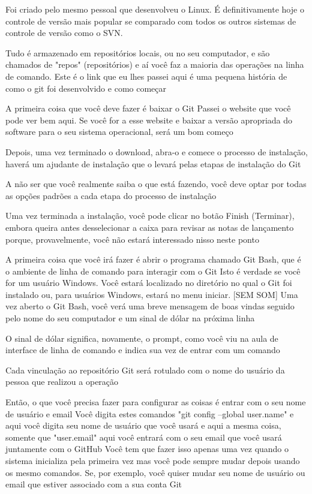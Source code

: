 Foi criado pelo mesmo pessoal que desenvolveu o Linux. É definitivamente hoje o controle de versão mais popular se comparado com todos os outros sistemas de controle de versão como o SVN. 

Tudo é armazenado em repositórios locais, ou no seu computador, e são chamados de "repos" (repositórios) e aí você faz a maioria das operações na linha de comando. Este é o link que eu lhes passei aqui é uma pequena história de como o git foi desenvolvido e como começar 

A primeira coisa que você deve fazer é baixar o Git Passei o website que você pode ver bem aqui. Se você for a esse website e baixar a versão apropriada do software para o seu sistema operacional, será um bom começo 

Depois, uma vez  terminado o download, abra-o e comece o processo de instalação, haverá um ajudante de instalação que o levará pelas etapas de instalação do Git 

A não ser que você realmente saiba o que está fazendo, você deve optar por todas as opções padrões a cada etapa do processo de instalação 

Uma vez terminada a instalação, você pode clicar no botão Finish (Terminar), embora queira antes desselecionar a caixa para revisar as notas de lançamento porque, provavelmente, você não estará interessado nisso neste ponto 

A primeira coisa que você irá fazer é abrir o programa chamado Git Bash, que é o ambiente de linha de comando para interagir com o Git Isto é verdade se você for um usuário Windows. Você estará localizado no diretório no qual o Git foi instalado ou, para usuários Windows, estará no menu iniciar. [SEM SOM] Uma vez aberto o Git Bash, você verá uma breve mensagem de boas vindas seguido pelo nome do seu computador e um sinal de dólar na próxima linha 

O sinal de dólar significa, novamente, o prompt, como você viu na aula de interface de linha de comando e indica sua vez de entrar com um comando 

Cada vinculação ao repositório Git será rotulado com o nome do usuário da pessoa que realizou a operação 

Então, o que você precisa fazer para configurar as coisas é entrar com o seu nome de usuário e email Você digita estes comandos "git config --global user.name" e aqui você digita seu nome de usuário que você usará e aqui a mesma coisa, somente que "user.email" aqui você entrará com o seu email que você usará juntamente com o GitHub Você tem que fazer isso apenas uma vez quando o sistema inicializa pela primeira vez mas você pode sempre mudar depois usando os mesmo comandos. Se, por exemplo,  você quiser mudar seu nome de usuário ou email que estiver associado com a sua conta Git 

